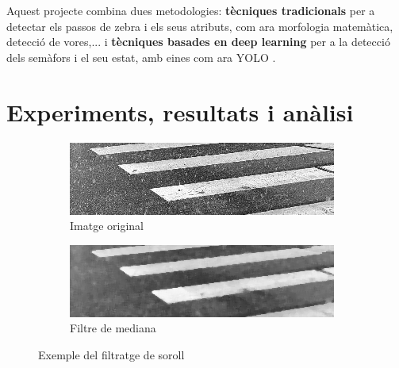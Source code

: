 \documentclass[10pt,a4paper,twocolumn,twoside]{article}
\begin{document}
 Aquest projecte combina dues metodologies: \textbf{tècniques tradicionals} per a detectar els passos de zebra i els seus atributs, com ara morfologia matemàtica, detecció de vores,... i \textbf{tècniques basades en deep learning} per a la detecció dels semàfors i el seu estat, amb eines com ara YOLO \cite{YOLO}.
 
\section{Experiments, resultats i anàlisi}

\begin{figure}[!h]
	\centering
	\begin{subfigure}{0.46\columnwidth}
		\includegraphics[width=\linewidth]{figs/neu1}
		\caption{Imatge original}
		\label{fig:classes}
	\end{subfigure}
	\quad
	\begin{subfigure}{0.46\columnwidth}
		\includegraphics[width=\linewidth]{figs/med_neu1}
		\caption{Filtre de mediana}
		\label{fig:regio}
	\end{subfigure}
	\caption{Exemple del filtratge de soroll}
\end{figure}


\end{document}
